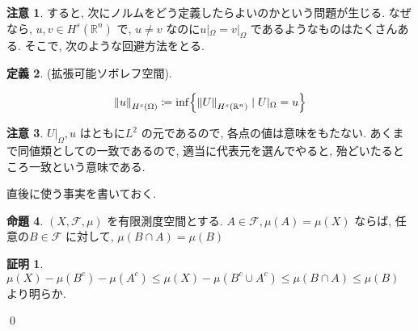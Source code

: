 \documentclass[10pt, fleqn, label-section=none]{bxjsarticle}
\theoremstyle{definition}
\newtheorem{dfn}{定義}[section]
\newtheorem{prop}[dfn]{命題}
\newtheorem*{pf*}{証明}
\newtheorem{remark}[dfn]{注意}
\newcommand{\cbra}[1]{\mleft\{#1\mright\}}
\newcommand{\norm}[1]{\left\|#1\right\|}
\renewcommand{\;}{\, ; \,}
\begin{document}
\begin{remark}
すると, 次にノルムをどう定義したらよいのかという問題が生じる. なぜなら, $u, v \in H^s(\mathbb R^n)$ で, $u \neq v$ なのに$u|_\Omega = v|_\Omega$ であるようなものはたくさんある. そこで, 次のような回避方法をとる. 
\end{remark}

\begin{dfn}(拡張可能ソボレフ空間). 

\begin{align*} \norm{u }_{H^s(\Omega)} \coloneqq \inf \cbra{ \norm{U}_{H^s(\mathbb R^n)} \mid U|_\Omega = u } \end{align*}

\end{dfn}

\begin{remark}$U|_\Omega, u$ はともに$L^2$ の元であるので, 各点の値は意味をもたない. あくまで同値類としての一致であるので, 適当に代表元を選んでやると, 
殆どいたるところ一致という意味である. 

\end{remark}

直後に使う事実を書いておく. 
\begin{prop}$(X, \mathcal F, \mu)$ を有限測度空間とする. $A \in \mathcal F, \mu(A) = \mu(X)$ ならば, 任意の$B \in \mathcal F$ に対して, 
$\mu(B \cap A) = \mu(B)$ 

\end{prop}
\begin{pf*}$\mu(X) - \mu (B^c) - \mu(A^c) \leq \mu(X) - \mu(B^c \cup A^c) \leq \mu(B \cap A) \leq  \mu(B)$ より明らか. 

\qed
\end{pf*}
\end{document}
